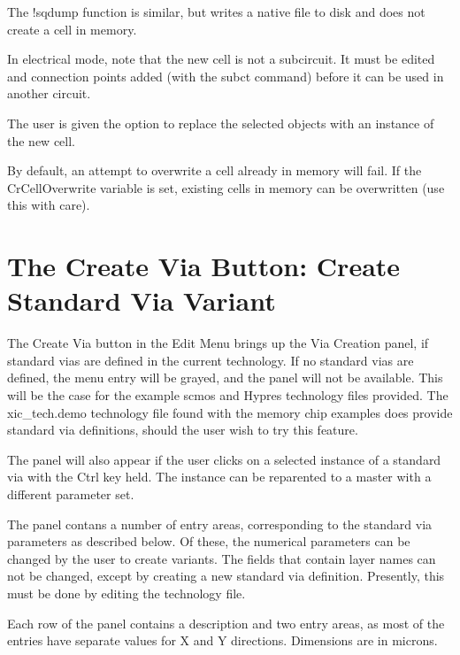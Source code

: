The {\cb !sqdump} function is similar, but writes a native file to
disk and does not create a cell in memory.

In electrical mode, note that the new cell is not a subcircuit.  It
must be edited and connection points added (with the {\cb subct}
command) before it can be used in another circuit.

The user is given the option to replace the selected objects with
an instance of the new cell.

By default, an attempt to overwrite a cell already in memory will
fail.  If the {\et CrCellOverwrite} variable is set, existing cells in
memory can be overwritten (use this with care). 


\section{The {\cb Create Via} Button: Create Standard Via Variant}

The {\cb Create Via} button in the {\cb Edit Menu} brings up the {\cb
Via Creation} panel, if standard vias are defined in the current
technology.  If no standard vias are defined, the menu entry will be
grayed, and the panel will not be available.  This will be the case
for the example {\vt scmos} and Hypres technology files provided.  The
{\vt xic\_tech.demo} technology file found with the memory chip
examples does provide standard via definitions, should the user wish
to try this feature.

The panel will also appear if the user clicks on a selected instance
of a standard via with the {\kb Ctrl} key held.  The instance can be
reparented to a master with a different parameter set.

The panel contans a number of entry areas, corresponding to the
standard via parameters as described below.  Of these, the numerical
parameters can be changed by the user to create variants.  The fields
that contain layer names can not be changed, except by creating a new
standard via definition.  Presently, this must be done by editing the
technology file.

Each row of the panel contains a description and two entry areas, as
most of the entries have separate values for X and Y directions. 
Dimensions are in microns.

